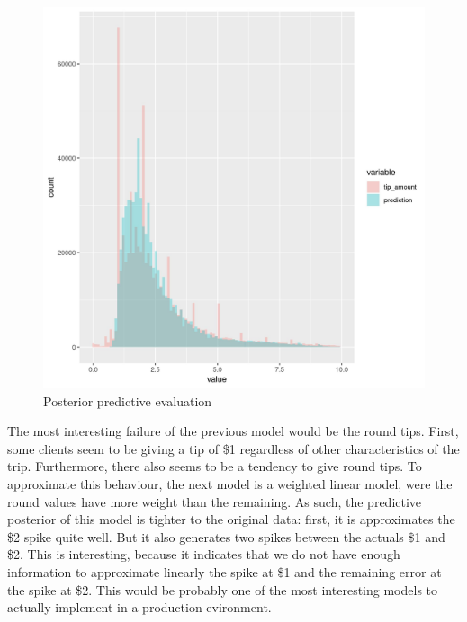 \documentclass[11pt]{article}
\begin{document}
\begin{figure}[htbp]
\centering
\includegraphics[width=.9\linewidth]{./plots/evaluation1PosteriorPredictive.jpg}
\caption{\label{fig:org7f87f81}
Posterior predictive evaluation}
\end{figure}

The most interesting failure of the previous model would be the round tips.
First, some clients seem to be giving a tip of \$1 regardless of other
characteristics of the trip. Furthermore, there also seems to be a tendency
to give round tips.
To approximate this behaviour, the next model is a weighted linear model,
were the round values have more weight than the remaining. As such, the
predictive posterior of this model is tighter to the original data:
first, it is approximates the \$2 spike quite well.
But it also generates two spikes between the actuals \$1 and \$2. This is
interesting, because it indicates that we do not have enough information
to approximate linearly the spike at \$1 and the remaining error at the
spike at \$2. This would be probably one of the most interesting models to
actually implement in a production evironment.
\end{document}
